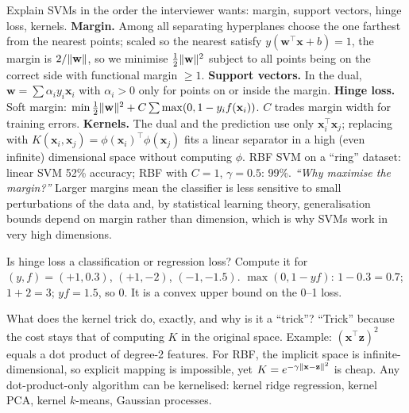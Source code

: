 \begin{qa}{ Explain SVMs in the order the interviewer wants:
margin, support vectors, hinge loss, kernels.}
\why
\textbf{Margin.} Among all separating hyperplanes choose the one farthest from the nearest points; scaled so the nearest satisfy
$y(\mathbf w^\top\mathbf x + b) = 1$, the margin is $2/\lVert \mathbf w\rVert$, so we minimise $\frac12\lVert \mathbf w\rVert^2$ subject to all points
being on the correct side with functional margin $\ge1$.
\textbf{Support vectors.} In the dual, $\mathbf w = \sum\alpha_iy_i\mathbf x_i$ with $\alpha_i > 0$ only for points on or inside the margin.
\textbf{Hinge loss.} Soft margin: $\min\frac12\lVert \mathbf w\rVert^2 + C\sum\max(0, 1 - y_if(\mathbf x_i))$. $C$ trades margin width for
training errors.
\textbf{Kernels.} The dual and the prediction use only $\mathbf x_i^\top\mathbf x_j$; replacing with $K(\mathbf x_i,\mathbf x_j) =
\phi(\mathbf x_i)^\top\phi(\mathbf x_j)$ fits a linear separator in a high (even infinite) dimensional space without computing $\phi$.
\worked RBF SVM on a ``ring'' dataset: linear SVM 52\% accuracy; RBF with $C = 1$, $\gamma = 0.5$: 99\%.
\pushes \emph{``Why maximise the margin?''} Larger margins mean the classifier is less sensitive to small perturbations of the data
and, by statistical learning theory, generalisation bounds depend on margin rather than dimension, which is why SVMs work in very high
dimensions.
\end{qa}

\begin{qa}{ Is hinge loss a classification or regression loss? Compute it for $(y, f) = (+1, 0.3)$,
$(+1, -2)$, $(-1, -1.5)$.}
\why $\max(0, 1 - yf)$: $1 - 0.3 = 0.7$; $1 + 2 = 3$; $yf = 1.5$, so $0$. It is a convex upper bound on the 0--1 loss.
\end{qa}

\begin{qa}{ What does the kernel trick do, exactly, and why is it a ``trick''?}
\why ``Trick'' because the cost stays that of computing $K$ in the original space. Example: $(\mathbf x^\top\mathbf z)^2$ equals a dot
product of degree-2 features. For RBF, the implicit space is infinite-dimensional, so explicit mapping is impossible, yet
$K = e^{-\gamma\lVert \mathbf x-\mathbf z\rVert^2}$ is cheap. Any dot-product-only algorithm can be kernelised: kernel ridge regression, kernel
PCA, kernel $k$-means, Gaussian processes.
\end{qa}

